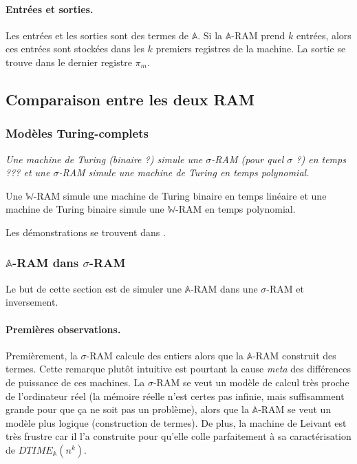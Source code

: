 \documentclass{report}
\newcommand{\bbA}{\mathbb{A}}
\begin{document}
		
			\paragraph{Entrées et sorties.}
			Les entrées et les sorties sont des termes de $\bbA$. Si la $\bbA$-RAM prend $k$ entrées, alors ces entrées sont stockées dans les $k$ premiers registres de la machine. La sortie se trouve dans le dernier registre $\pi_m$. 
		
		
		\subsection{Comparaison entre les deux RAM}
		\label{subsec:comparaison_RAMs}
		
		
			\subsubsection{Modèles Turing-complets}
			\label{subsubsec:turing_complet}
		
			\begin{theorem}
				\label{thm:RAMs_turing_completes}
				\emph{Une machine de Turing (binaire ?) simule une $\sigma$-RAM (pour quel $\sigma$ ?) en temps ??? et une $\sigma$-RAM simule une machine de Turing en temps polynomial.}
				
				Une $\mathbb{W}$-RAM simule une machine de Turing binaire en temps linéaire et une machine de Turing binaire simule une $\mathbb{W}$-RAM en temps polynomial.
			\end{theorem}
			
			Les démonstrations se trouvent dans \cite{Leivant1995} .

			
				\subsubsection{$\bbA$-RAM dans $\sigma$-RAM}
				\label{subsubsec:sim_A_RAM_sigma_RAM}
	
				Le but de cette section est de simuler une $\bbA$-RAM dans une $\sigma$-RAM et inversement.
				
				\paragraph{Premières observations.}
				\label{par:premieres_observations}
				Premièrement, la $\sigma$-RAM calcule des entiers alors que la $\bbA$-RAM construit des termes. Cette remarque plutôt intuitive est pourtant la cause \emph{meta} des différences de puissance de ces machines. La $\sigma$-RAM se veut un modèle de calcul très proche de l'ordinateur réel (la mémoire réelle n'est certes pas infinie, mais suffisamment grande pour que ça ne soit pas un problème), alors que la $\bbA$-RAM se veut un modèle plus logique (construction de termes). De plus, la machine de Leivant est très frustre car il l'a construite pour qu'elle colle parfaitement à sa caractérisation de $DTIME_{\bbA}(n^k)$.
				
\end{document}
